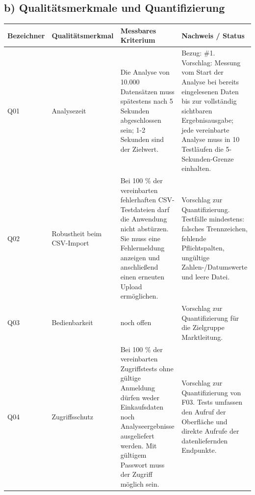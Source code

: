 \documentclass[a4paper,10pt]{article}
\begin{document}
        \subsection*{b) Qualitätsmerkmale und Quantifizierung}
        \begin{longtable}{>{\raggedright\arraybackslash}p{}>{\raggedright\arraybackslash}p{}>{\raggedright\arraybackslash}p{}>{\raggedright\arraybackslash}p{}}

            \toprule
            \textbf{Bezeichner} & \textbf{Qualitätsmerkmal}  & \textbf{Messbares Kriterium}                                                                                                                                                                 & \textbf{Nachweis / Status}                                                                                                                                                                                          \\
            \midrule\endhead
            \bottomrule\endfoot
            Q01                 & Analysezeit                & Die Analyse von 10.000 Datensätzen muss spätestens nach 5 Sekunden abgeschlossen sein; 1-2 Sekunden sind der Zielwert. & Bezug: \#1. Vorschlag: Messung vom Start der Analyse bei bereits eingelesenen Daten bis zur vollständig sichtbaren Ergebnisausgabe; jede vereinbarte Analyse muss in 10 Testläufen die 5-Sekunden-Grenze einhalten. \\
            \midrule
            Q02                 & Robustheit beim CSV-Import & Bei 100 \% der vereinbarten fehlerhaften CSV-Testdateien darf die Anwendung nicht abstürzen. Sie muss eine Fehlermeldung anzeigen und anschlie\ss{}end einen erneuten Upload ermöglichen. & Vorschlag zur Quantifizierung. Testfälle mindestens: falsches Trennzeichen, fehlende Pflichtspalten, ungültige Zahlen-/Datumswerte und leere Datei. \\
            \midrule
            Q03                 & Bedienbarkeit              & noch offen                                                                                                                                                                                 & Vorschlag zur Quantifizierung für die Zielgruppe Marktleitung.                                                                                                                                                      \\
            \midrule
            Q04                 & Zugriffsschutz             & Bei 100 \% der vereinbarten Zugriffstests ohne gültige Anmeldung dürfen weder Einkaufsdaten noch Analyseergebnisse ausgeliefert werden. Mit gültigem Passwort muss der Zugriff möglich sein. & Vorschlag zur Quantifizierung von F03. Tests umfassen den Aufruf der Oberfläche und direkte Aufrufe der datenliefernden Endpunkte. \\
        \end{longtable}
\addtocounter{table}{-1}
        \clearpage
\end{document}
